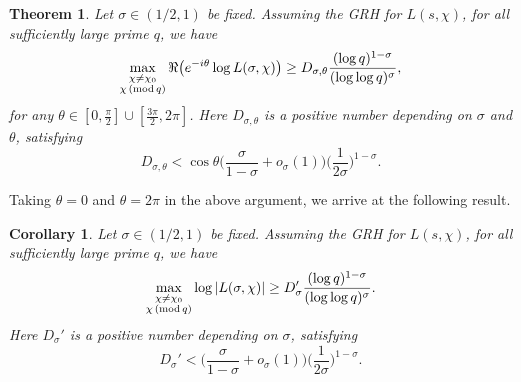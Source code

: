 \documentclass[12pt]{amsart}
\numberwithin{equation}{section}
\theoremstyle{plain}
\newtheorem{thm}{Theorem}
\newtheorem{cor}{Corollary}
\theoremstyle{remark}
\theoremstyle{definition}
\theoremstyle{remark}
\renewcommand{\mod}[1]{\,({\rm mod}\,#1)}
\begin{document}
\begin{thm}\label{main-thm-2}
Let $\sigma\in(1/2,1)$ be fixed. Assuming the GRH for $L(s,\chi)$, for all sufficiently large prime $q$, we have
\begin{equation*}
\begin{aligned}
\max_{\substack{\chi\neq\chi_0\\ \chi\mod q}}
\Re\big(e^{-i\theta}\log L(\sigma,\chi)\big)\geq D_{\sigma,\theta}\frac{(\log q)^{1-\sigma}}{(\log\log q)^{\sigma}},
\end{aligned}
\end{equation*}
for any $\theta\in[0,\frac{\pi}{2}]\cup[\frac{3\pi}{2},2\pi]$. Here $D_{\sigma,\theta}$ is a positive number depending on $\sigma$ and $\theta$, satisfying
\[
D_{\sigma,\theta}<\cos\theta\bigg(\frac{\sigma}{1-\sigma}+o_{\sigma}(1)\bigg)
\bigg(\frac{1}{2\sigma}\bigg)^{1-\sigma}.
\]
\end{thm}

Taking $\theta=0$ and $\theta=2\pi$ in the above argument, we arrive at the following result.

\begin{cor}\label{main-cor-2}
Let $\sigma\in(1/2,1)$ be fixed. Assuming the GRH for $L(s,\chi)$, for all sufficiently large prime $q$, we have
\begin{equation*}
\begin{aligned}
\max_{\substack{\chi\neq\chi_0\\ \chi\mod q}}
\log |L(\sigma,\chi)|\geq D_{\sigma}'\frac{(\log q)^{1-\sigma}}{(\log\log q)^{\sigma}}.
\end{aligned}
\end{equation*}
Here $D_{\sigma}'$ is a positive number depending on $\sigma$, satisfying
\[
D_{\sigma}'<\bigg(\frac{\sigma}{1-\sigma}+o_{\sigma}(1)\bigg)
\bigg(\frac{1}{2\sigma}\bigg)^{1-\sigma}.
\]
\end{cor}



\end{document}
